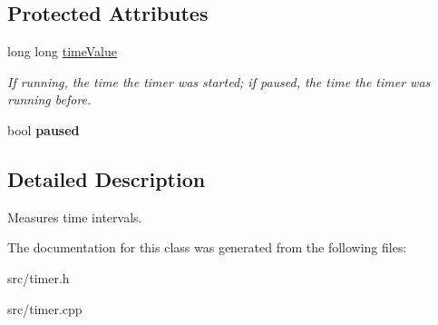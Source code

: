 \subsection*{\-Protected \-Attributes}
\begin{DoxyCompactItemize}
\item 
\hypertarget{classMyTimer_a0ced069fba5774d6753adba174013fbe}{
long long \hyperlink{classMyTimer_a0ced069fba5774d6753adba174013fbe}{time\-Value}}
\label{d0/df5/classMyTimer_a0ced069fba5774d6753adba174013fbe}

\begin{DoxyCompactList}\small\item\em \-If running, the time the timer was started; if paused, the time the timer was running before. \end{DoxyCompactList}\item 
\hypertarget{classMyTimer_a2bba9fc5ee49bc266f3960ec03796a95}{
bool {\bfseries paused}}
\label{d0/df5/classMyTimer_a2bba9fc5ee49bc266f3960ec03796a95}

\end{DoxyCompactItemize}


\subsection{\-Detailed \-Description}
\-Measures time intervals. 

\-The documentation for this class was generated from the following files\-:\begin{DoxyCompactItemize}
\item 
src/timer.\-h\item 
src/timer.\-cpp\end{DoxyCompactItemize}
